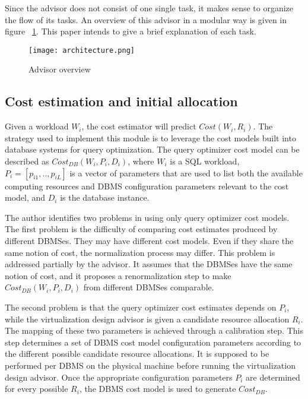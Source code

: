 Since the advisor does not consist of one single task, it makes sense to organize the flow of its tasks. An overview of this advisor in a modular way is given in figure ~\ref{fig:architecture}. This paper intends to give a brief explanation of each task.


\begin{figure}[ht]
\centering
\texttt{[image: architecture.png]}
\caption{Advisor overview}
\label{fig:architecture}
\end{figure} 

\subsection{Cost estimation and initial allocation}
\label{subsec:cost}

Given a workload $W_{i}$, the cost estimator will predict $Cost(W_{i},R_{i})$. The strategy used to implement this module is to leverage the cost models built into database systems for query optimization. The query optimizer cost model can be described as $Cost_{DB}(W_{i},P_{i},D_{i})$, where $W_{i}$ is a SQL workload, $P_{i} = [p_{i1},..,p_{iL}]$ is a vector of parameters that are used to list both the available computing resources and DBMS configuration parameters relevant to the cost model, and $D_{i}$ is  the database instance. 

The author identifies two problems in using only query optimizer cost models. The first problem is the difficulty of comparing cost estimates produced by different DBMSes. They may have different cost models. Even if they share the same notion of cost, the normalization process may differ. This problem is addressed partially by the advisor. It assumes that the DBMSes have the same notion of cost, and it proposes a renormalization step to make $Cost_{DB}(W_{i},P_{i},D_{i})$ from different DBMSes comparable.%

The second problem is that the query optimizer cost estimates depends on $P_{i}$, while the virtualization design advisor is given a candidate resource allocation $R_{i}$. The mapping of these two parameters is achieved through a calibration step. This step determines a set of DBMS cost model configuration parameters according to the different possible candidate resource allocations. It is supposed to be performed per DBMS on the physical machine before running the virtualization design advisor. Once the appropriate configuration parameters $P_{i}$ are determined for every possible $R_{i}$, the DBMS cost model is used to generate $Cost_{DB}$.

